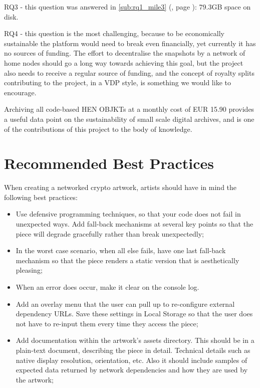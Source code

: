 RQ3 - this question was answered in \autoref{sub:rq1_mile3} (, page \pageref{sub:rq1_mile3}): 79.3GB space on disk.

RQ4 - this question is the most challenging, because to be economically sustainable the platform would need to break even financially, yet currently it has no sources of funding. The effort to decentralise the snapshots by a network of home nodes should go a long way towards achieving this goal, but the project also needs to receive a regular source of funding, and the concept of royalty splits contributing to the project, in a VDP style, is something we would like to encourage.

Archiving all code-based HEN OBJKTs at a monthly cost of EUR 15.90 provides a useful data point on the sustainability of small scale digital archives, and is one of the contributions of this project to the body of knowledge.



\section{Recommended Best Practices}

When creating a networked crypto artwork, artists should have in mind the following best practices:

 \begin{itemize}
	\item Use defensive programming techniques, so that your code does not fail in unexpected ways. Add fall-back mechanisms at several key points so that the piece will degrade gracefully rather than break unexpectedly;
	\item In the worst case scenario, when all else fails, have one last fall-back mechanism so that the piece renders a static version that is aesthetically pleasing;
	\item When an error does occur, make it clear on the console log.
	\item Add an overlay menu that the user can pull up to re-configure external dependency URLs. Save these settings in Local Storage so that the user does not have to re-input them every time they access the piece;
	\item Add documentation within the artwork's assets directory. This should be in a plain-text document, describing the piece in detail. Technical details such as native display resolution, orientation, etc. Also it should include samples of expected data returned by network dependencies and how they are used by the artwork;
 \end{itemize}


